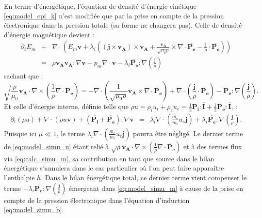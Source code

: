 En terme d'énergétique, l'équation de densité d'énergie cinétique \eqref{eq:model_cpi_k} n'est modifiée que par la prise en compte de la pression électronique dans la pression totale (sa forme ne changera pas). Celle de densité d'énergie magnétique devient :
\begin{eqnarray}
  \label{eq:model_simu_m}   \partial_t E_m  &+&\nabla   \cdot  \left(E_m\boldsymbol{v}+ \lambda_i \left(\left(\boldsymbol{j}  \times \boldsymbol{v_A}\right)\times \boldsymbol{v_A}  + \frac{\boldsymbol{v_A}}{\sqrt{\mu_0\rho}}  \times \nabla \cdot \overline{\boldsymbol{P_{e}}} -  \frac{\boldsymbol{j}}{\rho}\cdot \overline{\boldsymbol{P_{e}}}\right) \right) \nonumber\\
  &=& \rho  \boldsymbol{v_A}\boldsymbol{v_A}  : \nabla \boldsymbol{v}- p_m  \nabla \cdot \boldsymbol{v}   - \lambda_i \overline{\boldsymbol{P_{e}}} : \nabla \left(\frac{\boldsymbol{j}}{\rho} \right)
\end{eqnarray}
sachant que :
\begin{equation}
\label{eq:calc_simu_m} 
\sqrt{\frac{\rho}{\mu_0}} \boldsymbol{v_A} \cdot \nabla \times \left(\frac{1}{\rho} \nabla \cdot \overline{\boldsymbol{P_{e}}}\right) = - \nabla \cdot \left(\frac{1}{\sqrt{\mu_0 \rho}} \boldsymbol{v_A} \times \nabla \cdot \overline{\boldsymbol{P_{e}}}  \right) +  \nabla \cdot \left( \frac{ \boldsymbol{j}}{\rho} \cdot \overline{\boldsymbol{P_{e}}}\right) - \overline{\boldsymbol{P_{e}}} : \nabla \left(\frac{\boldsymbol{j}}{\rho} \right) .
\end{equation}
Et celle d'énergie interne, définie telle que  $\rho u = \rho_i u_i +  \rho_e u_e = \frac{1}{2} \overline{\boldsymbol{P_{i}}} : \overline{\boldsymbol{I}} +\frac{1}{2} \overline{\boldsymbol{P_{e}}} : \overline{\boldsymbol{I}}$, : 
\begin{eqnarray}
\label{eq:model_simu_u} \partial_t \left(\rho u\right) + \nabla \cdot \left(  \rho u \boldsymbol{v}\right) + \left(\overline{\boldsymbol{P_i}}+\overline{\boldsymbol{P_{e}}}\right) : \nabla \boldsymbol{v} & =&  \lambda_i \nabla \cdot  \left(\frac{m_e}{m_i} u_e \boldsymbol{j}\right) +  \lambda_i \overline{\boldsymbol{P_{e}}} : \nabla \left(\frac{\boldsymbol{j}}{\rho} \right) .
\end{eqnarray}
Puisque ici $\mu \ll 1$, le terme $\lambda_i \nabla \cdot  \left(\frac{m_e}{m_i} u_e \boldsymbol{j}\right)$ pourra être négligé. Le dernier terme de \eqref{eq:model_simu_u} étant relié à $\sqrt{\rho} \boldsymbol{v_A} \cdot \nabla \times \left(\frac{1}{\rho} \nabla \cdot \overline{\boldsymbol{P_{e}}}\right) $ et à des termes flux via \eqref{eq:calc_simu_m}, sa contribution en tant que source dans le bilan énergétique s'annulera dans le cas particulier où l'on peut faire apparaître l'enthalpie $h$. Dans le bilan énergétique total, ce dernier terme vient compenser le terme $- \lambda_i \overline{\boldsymbol{P_{e}}} : \nabla \left(\frac{\boldsymbol{j}}{\rho} \right)$ émergeant dans \eqref{eq:model_simu_m} à cause de la prise en compte de la pression électronique dans l'équation d'induction \eqref{eq:model_simu_b}.

